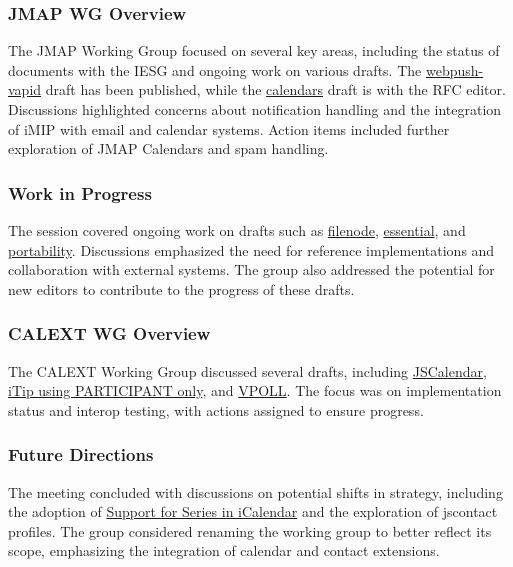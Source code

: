 \documentclass{article}
\begin{document}
\subsubsection{JMAP WG Overview}
The JMAP Working Group focused on several key areas, including the status of documents with the IESG and ongoing work on various drafts. The \href{https://datatracker.ietf.org/doc/html/draft-ietf-jmap-webpush-vapid}{webpush-vapid} draft has been published, while the \href{https://datatracker.ietf.org/doc/html/draft-ietf-jmap-calendars}{calendars} draft is with the RFC editor. Discussions highlighted concerns about notification handling and the integration of iMIP with email and calendar systems. Action items included further exploration of JMAP Calendars and spam handling.

\subsubsection{Work in Progress}
The session covered ongoing work on drafts such as \href{https://datatracker.ietf.org/doc/html/draft-ietf-jmap-filenode}{filenode}, \href{https://datatracker.ietf.org/doc/html/draft-ietf-jmap-essential}{essential}, and \href{https://datatracker.ietf.org/doc/html/draft-ietf-jmap-portability}{portability}. Discussions emphasized the need for reference implementations and collaboration with external systems. The group also addressed the potential for new editors to contribute to the progress of these drafts.

\subsubsection{CALEXT WG Overview}
The CALEXT Working Group discussed several drafts, including \href{https://datatracker.ietf.org/doc/html/draft-ietf-calext-jscalendar-icalendar-10}{JSCalendar}, \href{https://datatracker.ietf.org/doc/html/draft-ietf-calext-ical-tasks-12}{iTip using PARTICIPANT only}, and \href{https://datatracker.ietf.org/doc/html/draft-ietf-calext-vpoll-07}{VPOLL}. The focus was on implementation status and interop testing, with actions assigned to ensure progress.

\subsubsection{Future Directions}
The meeting concluded with discussions on potential shifts in strategy, including the adoption of \href{https://datatracker.ietf.org/doc/html/draft-ietf-calext-icalendar-series-03}{Support for Series in iCalendar} and the exploration of jscontact profiles. The group considered renaming the working group to better reflect its scope, emphasizing the integration of calendar and contact extensions.
\end{document}
